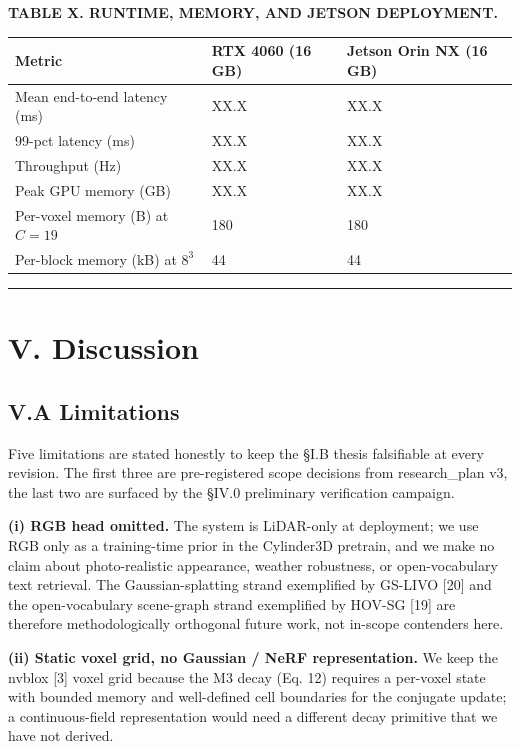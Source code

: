 \documentclass[
]{article}
\newcounter{none} %
\begin{document}
\textbf{TABLE X. RUNTIME, MEMORY, AND JETSON DEPLOYMENT.}

{\def\LTcaptype{none} %
\begin{longtable}[]{@{}lll@{}}
\toprule\noalign{}
Metric & RTX 4060 (16 GB) & Jetson Orin NX (16 GB) \\
\midrule\noalign{}
\endhead
\bottomrule\noalign{}
\endlastfoot
Mean end-to-end latency (ms) & XX.X & XX.X \\
99-pct latency (ms) & XX.X & XX.X \\
Throughput (Hz) & XX.X & XX.X \\
Peak GPU memory (GB) & XX.X & XX.X \\
Per-voxel memory (B) at \(C=19\) & 180 & 180 \\
Per-block memory (kB) at \(8^3\) & 44 & 44 \\
\end{longtable}
}

\begin{center}\rule{0.5\linewidth}{0.5pt}\end{center}

\section{V. Discussion}\label{v-discussion}

\subsection{V.A Limitations}\label{va-limitations}

Five limitations are stated honestly to keep the §I.B thesis falsifiable
at every revision. The first three are pre-registered scope decisions
from research\_plan v3, the last two are surfaced by the §IV.0
preliminary verification campaign.

\textbf{(i) RGB head omitted.} The system is LiDAR-only at deployment;
we use RGB only as a training-time prior in the Cylinder3D pretrain, and
we make no claim about photo-realistic appearance, weather robustness,
or open-vocabulary text retrieval. The Gaussian-splatting strand
exemplified by GS-LIVO {[}20{]} and the open-vocabulary scene-graph
strand exemplified by HOV-SG {[}19{]} are therefore methodologically
orthogonal future work, not in-scope contenders here.

\textbf{(ii) Static voxel grid, no Gaussian / NeRF representation.} We
keep the nvblox {[}3{]} voxel grid because the M3 decay (Eq. 12)
requires a per-voxel state with bounded memory and well-defined cell
boundaries for the conjugate update; a continuous-field representation
would need a different decay primitive that we have not derived.
\end{document}
